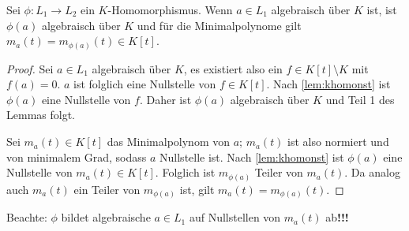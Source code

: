 \documentclass[12pt,a4paper]{scrartcl}
\begin{document}
\begin{lem}
	Sei $\phi\colon L_1\to L_2$ ein $K$-Homomorphismus. Wenn $a\in L_1$ algebraisch über $K$ ist, ist $\phi(a)$ algebraisch über $K$ und für die Minimalpolynome gilt $m_a(t) = m_{\phi(a)}(t)\in K[t]$.
\end{lem}

\begin{proof}
	Sei $a\in L_1$ algebraisch über $K$, es existiert also ein $f\in K[t]\setminus K$ mit $f(a) = 0$. $a$ ist folglich eine Nullstelle von $f \in K[t]$. Nach \cref{lem:khomonst} ist $\phi(a)$ eine Nullstelle von $f$. Daher ist $\phi(a)$ algebraisch über $K$ und Teil 1 des Lemmas folgt.
	
	Sei $m_a(t) \in K[t]$ das Minimalpolynom von $a$; $m_a(t)$ ist also normiert und von minimalem Grad, sodass $a$ Nullstelle ist. Nach \cref{lem:khomonst} ist $\phi(a)$ eine Nullstelle von $m_a(t)\in K[t]$. Folglich ist $m_{\phi(a)}$ Teiler von $m_a(t)$. Da analog auch $m_a(t)$ ein Teiler von $m_{\phi(a)}$ ist, gilt $m_a(t) = m_{\phi(a)} (t)$.
\end{proof}

\begin{bem}
	Beachte: $\phi$ bildet algebraische $a\in L_1$ auf Nullstellen von $m_a(t)$ ab\textbf{!!!}
\end{bem}
\end{document}

